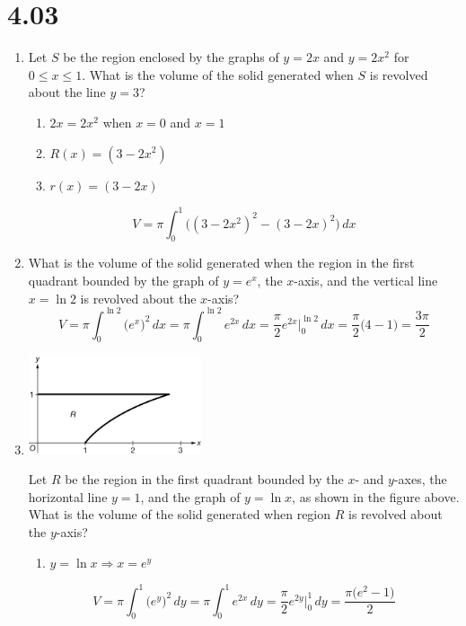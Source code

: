 \documentclass[12pt]{article}
\begin{document}
\section*{4.03}
\begin{enumerate}
    \item Let $S$ be the region enclosed by the graphs of $y = 2x$ and $y = 2x^2$ for $0 \leq x \leq 1$. What is the volume of the solid generated when $S$ is revolved about the line $y = 3$?
    \begin{enumerate}
        \item $2x=2x^2$ when $x=0$ and $x=1$
        \item $R(x)=(3-2x^2)$
        \item $r(x)=(3-2x)$
    \end{enumerate}
    $$\boxed{V=\pi\int_0^1\biggr((3-2x^2)^2-(3-2x)^2\biggr) \, dx}$$

    \item What is the volume of the solid generated when the region in the first quadrant bounded by the graph of $y=e^x$, the $x$-axis, and the vertical line $x=\ln 2$ is revolved about the $x$-axis?
   $$V=\pi\int_{0}^{\ln 2} \big(e^x\big)^2 \, dx = \pi\int_{0}^{\ln 2} e^{2x}\, dx = \frac{\pi}{2} e^{2x} \biggr\rvert_{0}^{\ln 2} \, dx = \frac{\pi}{2}\biggr(4-1\biggr) =\boxed{ \frac{3\pi}{2} }$$
\newpage
    \item 
    \begin{center}
        \includegraphics[width=2in]{4.031.png}
    \end{center}
    Let $R$ be the region in the first quadrant bounded by the $x$- and $y$-axes, the horizontal line $y=1$, and the graph of $y=\ln x$, as shown in the figure above. What is the volume of the solid generated when region $R$ is revolved about the $y$-axis?
    \begin{enumerate}
        \item $y=\ln x \Longrightarrow x = e^y$
    \end{enumerate}
    $$V=\pi\int_{0}^{1} \big(e^y\big)^2 \, dy = \pi\int_{0}^{1} e^{2x}\, dy = \frac{\pi}{2} e^{2y} \bigg\rvert_{0}^{1} \, dy = \boxed{\frac{\pi\big(e^2-1\big)}{2}}$$


\end{enumerate}
\end{document}
